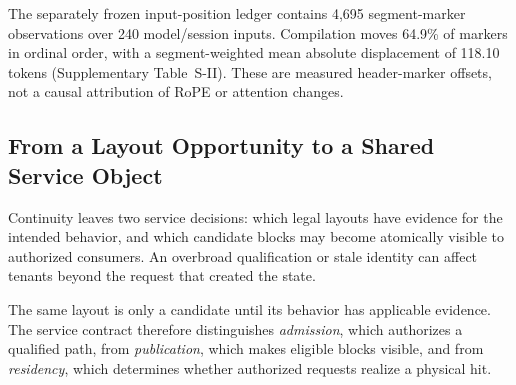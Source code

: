 The separately frozen input-position ledger contains 4,695 segment-marker observations over 240 model/session inputs. Compilation moves 64.9\% of markers in ordinal order, with a segment-weighted mean absolute displacement of 118.10 tokens (Supplementary Table~S-II). These are measured header-marker offsets, not a causal attribution of RoPE or attention changes.

\subsection{From a Layout Opportunity to a Shared Service Object}
Continuity leaves two service decisions: which legal layouts have evidence for the intended behavior, and which candidate blocks may become atomically visible to authorized consumers. An overbroad qualification or stale identity can affect tenants beyond the request that created the state.

The same layout is only a candidate until its behavior has applicable evidence. The service contract therefore distinguishes \emph{admission}, which authorizes a qualified path, from \emph{publication}, which makes eligible blocks visible, and from \emph{residency}, which determines whether authorized requests realize a physical hit.
